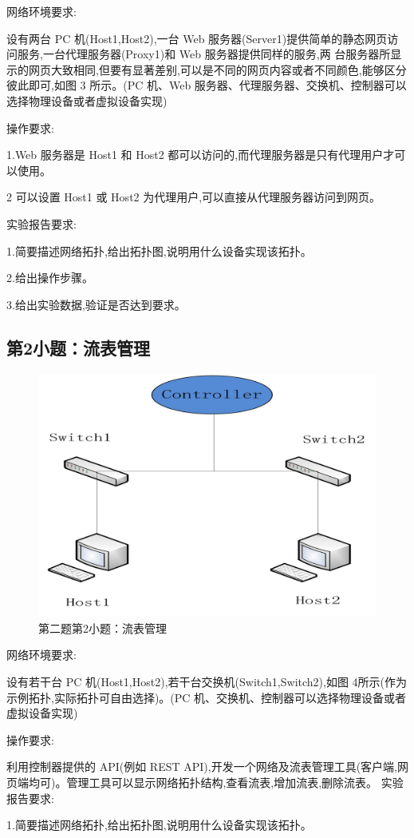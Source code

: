 \documentclass[format=draft,language=chinese,category=SDN]{hustreport}
\begin{document}
网络环境要求:

设有两台 PC 机(Host1,Host2),一台 Web 服务器(Server1)提供简单的静态网页访问服务,一台代理服务器(Proxy1)和 Web 服务器提供同样的服务,两
台服务器所显示的网页大致相同,但要有显著差别,可以是不同的网页内容或者不同颜色,能够区分彼此即可,如图 3 所示。(PC 机、Web 服务器、代理服务器、交换机、控制器可以选择物理设备或者虚拟设备实现)

操作要求:

1.Web 服务器是 Host1 和 Host2 都可以访问的,而代理服务器是只有代理用户才可以使用。

2 可以设置 Host1 或 Host2 为代理用户,可以直接从代理服务器访问到网页。

实验报告要求:

1.简要描述网络拓扑,给出拓扑图,说明用什么设备实现该拓扑。

2.给出操作步骤。

3.给出实验数据,验证是否达到要求。

\subsection{第2小题：流表管理}\label{sec:Q2_2}

\begin{figure}[!h]
\centering
\includegraphics[width=.618\textwidth]{fig/2_2-0.png}
\caption{第二题第2小题：流表管理}\label{fig:Q2_2-0}
\end{figure}

网络环境要求:

设有若干台 PC 机(Host1,Host2),若干台交换机(Switch1,Switch2),如图 4所示(作为示例拓扑,实际拓扑可自由选择)。(PC 机、交换机、控制器可以选择物理设备或者虚拟设备实现)

操作要求:

利用控制器提供的 API(例如 REST API),开发一个网络及流表管理工具(客户端,网页端均可)。管理工具可以显示网络拓扑结构,查看流表,增加流表,删除流表。
实验报告要求:

1.简要描述网络拓扑,给出拓扑图,说明用什么设备实现该拓扑。
\end{document}
